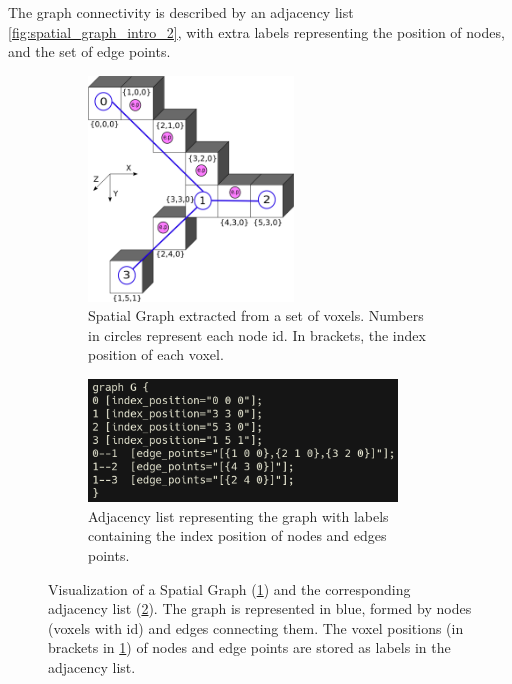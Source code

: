 The graph connectivity is described by an adjacency list \autoref{fig:spatial_graph_intro_2}, with extra labels representing the position of nodes, and the set of edge points.
\begin{figure}[!htb]
  \centering
  \begin{subfigure}{0.5\textwidth}
    \centering
    \includegraphics[width=0.6\textwidth]{Figures/chapter-image/spatial_graph_intro1.png}%
  \caption{\gls{Spatial Graph} extracted from a set of voxels. Numbers in circles represent each node id. In brackets, the index position of each voxel.}
    \label{fig:spatial_graph_intro_1}
  \end{subfigure}%
  \begin{subfigure}{0.5\textwidth}
    \centering
    \includegraphics[width=0.9\textwidth]{Figures/chapter-image/spatial_graph_intro2.png}%
    \caption{Adjacency list representing the graph with labels containing the index position of nodes and edges points.}
    \label{fig:spatial_graph_intro_2}
  \end{subfigure}%
  \caption{Visualization of a \gls{Spatial Graph} (\ref{fig:spatial_graph_intro_1}) and the corresponding adjacency list (\ref{fig:spatial_graph_intro_2}).
    The graph is represented in blue, formed by nodes (voxels with id) and edges connecting them.
  The voxel positions (in brackets in \ref{fig:spatial_graph_intro_1}) of nodes and edge points are stored as labels in the adjacency list.}
  \label{fig:spatial_graph_intro}
\end{figure}

